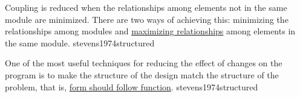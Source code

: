 \documentclass{article}
\begin{document}


  {Coupling is reduced when the relationships among elements not in the same module are minimized. There are two ways of achieving this: minimizing the relationships among modules and \ul{maximizing relationships} among elements in the same module.}
  {stevens1974structured}



  {One of the most useful techniques for reducing the effect of changes on the program is to make the structure of the design match the structure of the problem, that is, \ul{form should follow function}.}
  {stevens1974structured}
\end{document}
